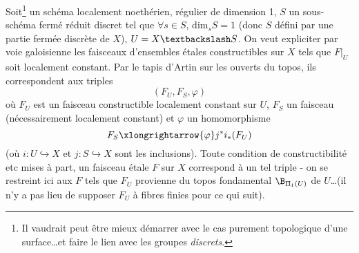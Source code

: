 Soit\footnote{Il vaudrait peut être mieux démarrer avec le cas purement topologique d'une surface\dots et faire le lien avec les groupes \emph{discrets}.} un schéma localement noethérien, régulier de dimension 1, $S$ un sous-schéma fermé réduit discret tel que $\forall s \in S$, dim$_s S = 1$ (donc $S$ défini par une partie fermée discrète de $X$), $U = X \textbackslash S$. On veut expliciter par voie galoisienne les faisceaux d'ensembles étales constructibles sur $X$ tels que $F |_U$ soit localement constant. Par le tapis d'Artin sur les ouverts du topos, ils correspondent aux triples
$$
(F_U, F_S, \varphi)
$$
où $F_U$ est un faisceau constructible localement constant sur $U$, $F_S$ un faisceau (nécessairement localement constant) et $\varphi$ un homomorphisme
$$
F_S \xlongrightarrow{\varphi} j^* i_* (F_U)
$$
(où $i: U \hookrightarrow X$ et $j: S \hookrightarrow X$ sont les inclusions). Toute condition de constructibilité etc mises à part, un faisceau étale $F$ sur $X$ correspond à un tel triple - on se restreint ici aux $F$ tels que $F_U$ provienne du topos fondamental $\B_{\Pi_1(U)}$ de $U$\dots (il n'y a pas lieu de supposer $F_U$ à fibres finies pour ce qui suit).

